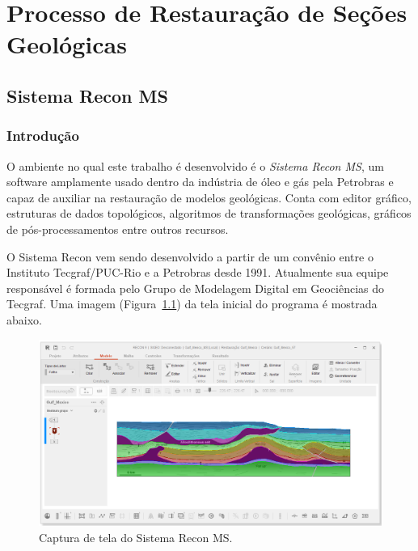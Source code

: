 
\chapter{Processo de Restauração de Seções Geológicas}

\section{Sistema Recon MS}

\subsection{Introdução}

O ambiente no qual este trabalho é desenvolvido é o \textit{Sistema Recon MS}\cite{ReconTecgraf}, um software amplamente usado dentro da indústria de óleo e gás pela Petrobras e capaz de auxiliar na restauração de modelos geológicas. Conta com editor gráfico, estruturas de dados topológicos, algoritmos de transformações geológicas, gráficos de pós-processamentos entre outros recursos.

O Sistema Recon vem sendo desenvolvido a partir de um convênio entre o Instituto Tecgraf/PUC-Rio e a Petrobras desde 1991. Atualmente sua equipe responsável é formada pelo Grupo de Modelagem Digital em Geociências do Tecgraf. Uma imagem (Figura~\ref{fig-recon}) da tela inicial do programa é mostrada abaixo.

\begin{figure} [H]
  \begin{center}
    \includegraphics[width=\textwidth]{images/fig-recon}
    \caption{Captura de tela do Sistema Recon MS\cite{Recon}.}\label{fig-recon}
  \end{center}
\end{figure}

